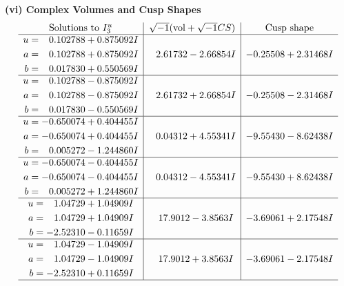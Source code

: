 \documentclass[1p]{elsarticle_modified}
\theoremstyle{definition}
\newcommand{\I}{\sqrt{-1}}
\begin{document}
\newpage\flushleft \textbf{(vi) Complex Volumes and Cusp Shapes}
$$\begin{array}{c|c|c}  
\text{Solutions to }I^u_{3}& \I (\text{vol} + \sqrt{-1}CS) & \text{Cusp shape}\\
 \hline 
\begin{aligned}
u &= \phantom{-}0.102788 + 0.875092 I \\
a &= \phantom{-}0.102788 + 0.875092 I \\
b &= \phantom{-}0.017830 + 0.550569 I\end{aligned}
 & \phantom{-}2.61732 - 2.66854 I & -0.25508 + 2.31468 I \\ \hline\begin{aligned}
u &= \phantom{-}0.102788 - 0.875092 I \\
a &= \phantom{-}0.102788 - 0.875092 I \\
b &= \phantom{-}0.017830 - 0.550569 I\end{aligned}
 & \phantom{-}2.61732 + 2.66854 I & -0.25508 - 2.31468 I \\ \hline\begin{aligned}
u &= -0.650074 + 0.404455 I \\
a &= -0.650074 + 0.404455 I \\
b &= \phantom{-}0.005272 - 1.244860 I\end{aligned}
 & \phantom{-}0.04312 + 4.55341 I & -9.55430 - 8.62438 I \\ \hline\begin{aligned}
u &= -0.650074 - 0.404455 I \\
a &= -0.650074 - 0.404455 I \\
b &= \phantom{-}0.005272 + 1.244860 I\end{aligned}
 & \phantom{-}0.04312 - 4.55341 I & -9.55430 + 8.62438 I \\ \hline\begin{aligned}
u &= \phantom{-}1.04729 + 1.04909 I \\
a &= \phantom{-}1.04729 + 1.04909 I \\
b &= -2.52310 - 0.11659 I\end{aligned}
 & \phantom{-}17.9012 - 3.8563 I & -3.69061 + 2.17548 I \\ \hline\begin{aligned}
u &= \phantom{-}1.04729 - 1.04909 I \\
a &= \phantom{-}1.04729 - 1.04909 I \\
b &= -2.52310 + 0.11659 I\end{aligned}
 & \phantom{-}17.9012 + 3.8563 I & -3.69061 - 2.17548 I\\
 \hline 
 \end{array}$$\newpage\newpage\renewcommand{\arraystretch}{1}
\end{document}

